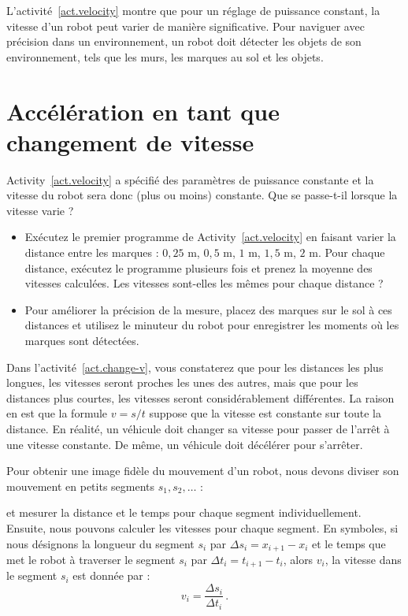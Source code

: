 {L'activité~\ref{act.velocity} montre que pour un réglage de puissance constant, la vitesse d'un robot peut varier de manière significative. Pour naviguer avec précision dans un environnement, un robot doit détecter les objets de son environnement, tels que les murs, les marques au sol et les objets.

\section{Accélération en tant que changement de vitesse}\label{s.acceleration}

Activity~\ref{act.velocity} a spécifié des paramètres de puissance constante et la vitesse du robot sera donc (plus ou moins) constante. Que se passe-t-il lorsque la vitesse varie ?


\begin{framed}
\begin{itemize}
\item Exécutez le premier programme de Activity~\ref{act.velocity} en faisant varier la distance entre les marques : $0,25$ m, $0,5$ m, $1$ m, $1,5$ m, $2$ m. Pour chaque distance, exécutez le programme plusieurs fois et prenez la moyenne des vitesses calculées. Les vitesses sont-elles les mêmes pour chaque distance ?
\item Pour améliorer la précision de la mesure, placez des marques sur le sol à ces distances et utilisez le minuteur du robot pour enregistrer les moments où les marques sont détectées.
\end{itemize}
\end{framed}

Dans l'activité~\ref{act.change-v}, vous constaterez que pour les distances les plus longues, les vitesses seront proches les unes des autres, mais que pour les distances plus courtes, les vitesses seront considérablement différentes. La raison en est que la formule $v=s/t$ suppose que la vitesse est constante sur toute la distance. En réalité, un véhicule doit changer sa vitesse pour passer de l'arrêt à une vitesse constante. De même, un véhicule doit décélérer pour s'arrêter.

Pour obtenir une image fidèle du mouvement d'un robot, nous devons diviser son mouvement en petits segments $s_1,s_2,\ldots$ :
\begin{center}
\end{center}
et mesurer la distance et le temps pour chaque segment individuellement. Ensuite, nous pouvons calculer les vitesses pour chaque segment. En symboles, si nous désignons la longueur du segment $s_i$ par $\Delta s_i = x_{i+1}-x_i$ et le temps que met le robot à traverser le segment $s_i$ par $\Delta t_i = t_{i+1}-t_i$, alors $v_i$, la vitesse dans le segment $s_i$ est donnée par :
\[v_i = \frac{\Delta s_i}{\Delta t_i}\,.\]

}
